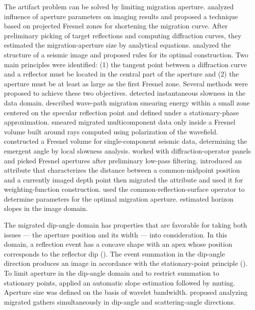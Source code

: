 The artifact problem can be solved by limiting migration aperture. \citet[]{schleicher97} analyzed 
influence of aperture parameters on imaging results and proposed a technique based on projected Fresnel zones 
for shortening the migration curve. After preliminary picking of target 
reflections and computing diffraction curves, they estimated the migration-aperture size by
analytical equations. \citet[]{sun98} analyzed the structure of a seismic image and proposed rules for its 
optimal construction. Two main principles were identified: (1) the tangent point between a diffraction curve and
a reflector must be located in the central part of the aperture and (2) the aperture must be at least as large as the first
Fresnel zone. Several methods were proposed to achieve these two objectives. \citet[]{tillmanns99} detected
instantaneous slowness in the data domain. \citet[]{sun01} described wave-path migration smearing energy 
within a small zone centered on the specular reflection point and defined under a stationary-phase
approximation. \citet[]{luth05} smeared migrated multicomponent data only inside a Fresnel volume built
around rays computed using polarization of the wavefield. \citet[]{buske09} constructed a Fresnel volume for
single-component seismic data, determining the emergent angle by local slowness analysis.
\citet[]{tabti04} worked with diffraction-operator panels and picked Fresnel apertures 
after preliminary low-pass filtering. \citet[]{kabbej07} introduced an attribute that characterizes the distance 
between a common-midpoint position and a currently imaged depth point then migrated the attribute and used it for
weighting-function construction. \citet[]{spinner07} used the common-reflection-surface operator to determine
parameters for the optimal migration aperture. \citet[]{alerini09} estimated horizon slopes in the image domain.

The migrated dip-angle domain has properties that are favorable for taking both issues --- the aperture 
position and its width --- into consideration. In this domain, a reflection event has a concave shape with
an apex whose position corresponds to the reflector dip (\citealp[]{audebert02,landa08,klokov12}). 
The event summation in the dip-angle direction produces an image in accordance with the stationary-point
principle (\citealp[]{bleistein01}). To limit aperture in the dip-angle domain and to restrict summation to stationary points, 
\citet[]{bienati09} applied an automatic slope estimation followed by muting. Aperture size was defined on the basis of wavelet bandwidth.
\citet[]{dafni12} proposed analyzing migrated gathers simultaneously in dip-angle and scattering-angle directions.

